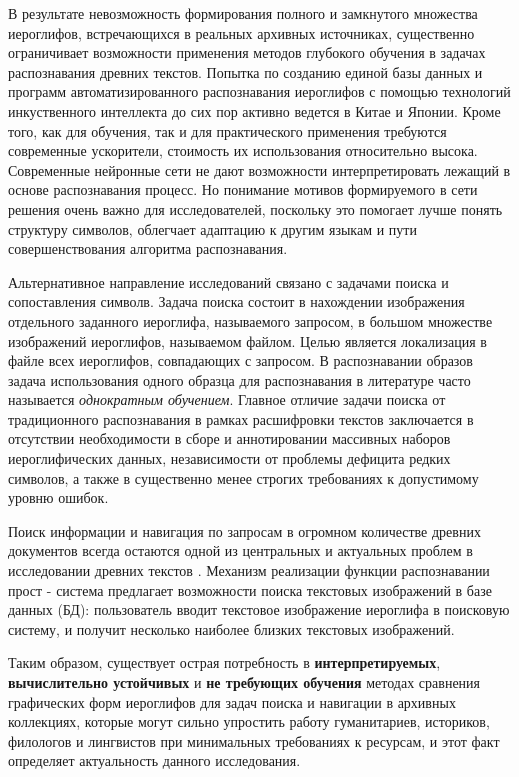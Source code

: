 В результате невозможность формирования полного и замкнутого множества иероглифов, встречающихся в реальных архивных источниках, существенно ограничивает возможности применения методов глубокого обучения в задачах распознавания древних текстов. Попытка по созданию единой базы данных и программ автоматизированного распознавания иероглифов с помощью технологий инкуственного интеллекта до сих пор активно ведется \cite{yumasheva2023automated} в Китае и Японии. Кроме того, как для обучения, так и для практического применения требуются современные ускорители, стоимость их использования относительно высока. Современные нейронные сети не дают возможности интерпретировать лежащий в основе распознавания процесс. Но понимание мотивов формируемого в сети решения очень важно для исследователей, поскольку это помогает лучше понять структуру символов, облегчает адаптацию к другим языкам и пути совершенствования алгоритма распознавания.

Альтернативное направление исследований связано с задачами поиска и
сопоставления символв. Задача поиска состоит в нахождении изображения отдельного заданного иероглифа, называемого запросом, в большом множестве изображений иероглифов, называемом файлом. Целью является локализация в файле всех иероглифов, совпадающих с запросом. В распознавании образов задача использования одного образца для распознавания в литературе часто называется \textit{однократным обучением}. Главное отличие задачи поиска от традиционного распознавания в рамках расшифровки текстов заключается в отсутствии необходимости в сборе и аннотировании массивных наборов иероглифических данных, независимости от проблемы дефицита редких символов, а также в существенно менее строгих требованиях к допустимому уровню ошибок.

Поиск информации и навигация по запросам в огромном количестве древних документов всегда остаются одной из центральных и актуальных проблем в исследовании древних текстов \cite{yumasheva2023automated}. Механизм реализации функции распознавании прост - система предлагает возможности поиска текстовых изображений в базе данных (БД): пользователь вводит текстовое изображение иероглифа в поисковую систему, и получит несколько наиболее близких текстовых изображений.

Таким образом, существует острая потребность в \textbf{интерпретируемых}, \textbf{вычислительно устойчивых} и \textbf{не требующих обучения} методах сравнения графических форм иероглифов для задач поиска и навигации в архивных коллекциях, которые могут сильно упростить работу гуманитариев, историков, филологов и лингвистов при минимальных требованиях к ресурсам, и этот факт определяет актуальность данного исследования.

